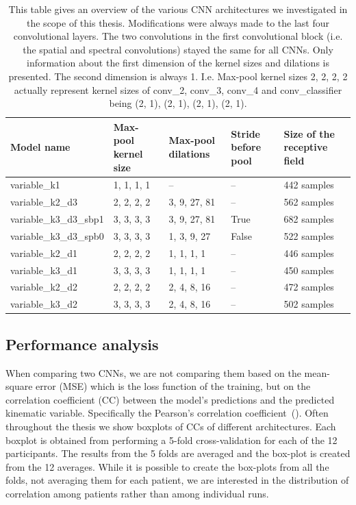 \begin{table}[!htpb]
\centering
\begin{tabular}{|p{3.7cm}|p{1.7cm}|p{2cm}|p{1.2cm}|p{2.5cm}|}
\toprule
Model name & Max-pool kernel size & Max-pool dilations & Stride before pool & Size of the receptive field \\
\midrule
variable\_k1 & 1, 1, 1, 1 & -- & -- & 442 samples \\
\hline
variable\_k2\_d3 & 2, 2, 2, 2 & 3, 9, 27, 81 & -- & 562 samples \\
\hline
variable\_k3\_d3\_sbp1 & 3, 3, 3, 3 & 3, 9, 27, 81 & True & 682 samples \\
\hline
variable\_k3\_d3\_spb0 & 3, 3, 3, 3  & 1, 3, 9, 27 & False & 522 samples \\
\hline
variable\_k2\_d1 & 2, 2, 2, 2 & 1, 1, 1, 1 & -- & 446 samples \\
\hline
variable\_k3\_d1 & 3, 3, 3, 3  & 1, 1, 1, 1 & -- & 450 samples \\
\hline
variable\_k2\_d2 & 2, 2, 2, 2 & 2, 4, 8, 16 & -- & 472 samples \\
\hline
variable\_k3\_d2 & 3, 3, 3, 3 & 2, 4, 8, 16 & -- & 502 samples \\
\hline
\bottomrule
\end{tabular}
\caption[Architectural modifications]{This table gives an overview of the various CNN architectures we investigated in the scope of this thesis.
Modifications were always made to the last four convolutional layers. The two convolutions in the first convolutional block (i.e. the spatial and spectral convolutions) stayed the same for all CNNs.
Only information about the first dimension of the kernel sizes and dilations is presented.
The second dimension is always 1.
I.e. Max-pool kernel sizes 2, 2, 2, 2 actually represent kernel sizes of conv\_2, conv\_3, conv\_4 and conv\_classifier being (2, 1), (2, 1), (2, 1), (2, 1). }
\label{tab:architectures-description}
\end{table}

\subsection{Performance analysis}\label{subsec:performance-analysis}
When comparing two CNNs, we are not comparing them based on the mean-square error (MSE) which is the loss function of the training, but on the correlation coefficient (CC) between the model's predictions and the predicted kinematic variable.
Specifically the Pearson's correlation coefficient~(\cite{pearson-vii-1895}).
Often throughout the thesis we show boxplots of CCs of different architectures.
Each boxplot is obtained from performing a 5-fold cross-validation for each of the 12 participants.
The results from the 5 folds are averaged and the box-plot is created from the 12 averages.
While it is possible to create the box-plots from all the folds, not averaging them for each patient, we are interested in the distribution of correlation among patients rather than among individual runs.